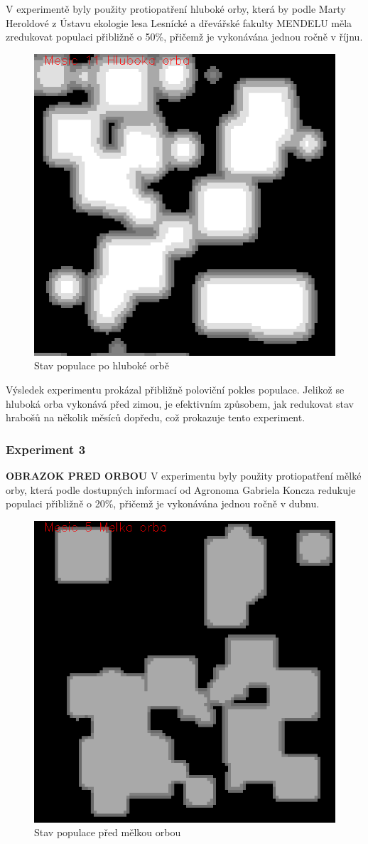 \documentclass[a4paper,11pt]{article}
\begin{document}
V experimentě byly použity protiopatření hluboké orby, která by podle Marty Heroldové z Ústavu ekologie lesa Lesnícké a dřevářské fakulty MENDELU měla zredukovat populaci přibližně o 50\%, přičemž je vykonávána jednou ročně v říjnu. 

\begin{figure}[h]
\begin{center}
    \includegraphics[width=.4\linewidth]{hlub_orba11.png}
    \caption{Stav populace po hluboké orbě}
    \label{exp2_obr2}
\end{center}
\end{figure}

Výsledek experimentu prokázal přibližně poloviční pokles populace. Jelikož se hluboká orba vykonává před zimou, je efektivním způsobem, jak redukovat stav hrabošů na několik měsíců dopředu, což prokazuje tento experiment.
\newpage

\subsubsection{Experiment 3}
\textbf{OBRAZOK PRED ORBOU}
V experimentu byly použity protiopatření mělké orby, která podle dostupných informací od Agronoma Gabriela Koncza redukuje populaci přibližně o 20\%, přičemž je vykonávána jednou ročně v dubnu. 

\begin{figure}[h]
\begin{center}
    \includegraphics[width=.4\linewidth]{melka_orba5.png}
    \caption{Stav populace před mělkou orbou}
    \label{exp3_obr2}
\end{center}
\end{figure}
\end{document}
